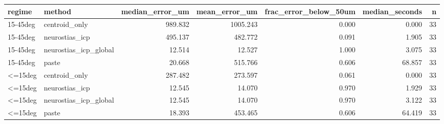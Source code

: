 \begin{tabular}{llrrrrr}
\toprule
regime & method & median_error_um & mean_error_um & frac_error_below_50um & median_seconds & n \\
\midrule
15-45deg & centroid_only & 989.832 & 1005.243 & 0.000 & 0.000 & 33 \\
15-45deg & neurostias_icp & 495.137 & 482.772 & 0.091 & 1.905 & 33 \\
15-45deg & neurostias_icp_global & 12.514 & 12.527 & 1.000 & 3.075 & 33 \\
15-45deg & paste & 20.668 & 515.766 & 0.606 & 68.857 & 33 \\
<=15deg & centroid_only & 287.482 & 273.597 & 0.061 & 0.000 & 33 \\
<=15deg & neurostias_icp & 12.545 & 14.070 & 0.970 & 1.929 & 33 \\
<=15deg & neurostias_icp_global & 12.545 & 14.070 & 0.970 & 3.122 & 33 \\
<=15deg & paste & 18.393 & 453.465 & 0.606 & 64.419 & 33 \\
\bottomrule
\end{tabular}
